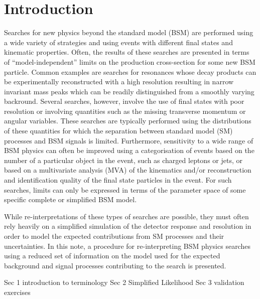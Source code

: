 \section{Introduction}
\label{sec:intro}

Searches for new physics beyond the standard model (BSM) are performed using a wide variety of 
strategies and using events with different final states and kinematic properties.  Often, 
the results of these searches are presented in terms of ``model-independent'' limits on the production 
cross-section for some new BSM particle. Common examples are searches for resonances whose decay products 
can be experimentally reconstructed with a high resolution resulting in narrow invariant mass peaks which can be readily distinguished from 
a smoothly varying backround. Several searches, however, involve the use of final states with poor resolution or involving 
quantities such as the missing transverse momentum \ptvecmiss or angular variables. These searches are typically performed using the 
distributions of these quantities for which the separation between standard model (SM) processes and BSM signals is limited. Furthermore, 
sensitivity to a wide range of BSM physics can often be improved using a categorisation of events based on the number of a particular 
object in the event, such as charged leptons or jets, or based on a multivariate analysis (MVA) of the kinematics and/or reconstruction and 
identification quality of the final state particles in the event. For such searches, limits can only be expressed in terms of the 
parameter space of some specific complete or simplified BSM model.

While re-interpretations of these types of searches are possible, they must often rely heavily on a simplified simulation of 
the detector response and resolution in order to model the expected contributions from SM processes and their uncertainties. 
In this note, a procedure for re-interpreting BSM physics searches using a reduced set of information on the model used for the 
expected background and signal processes contributing to the search is presented. 

Sec 1 introduction to terminology 
Sec 2 Simplified Likelihood 
Sec 3 validation exercises




